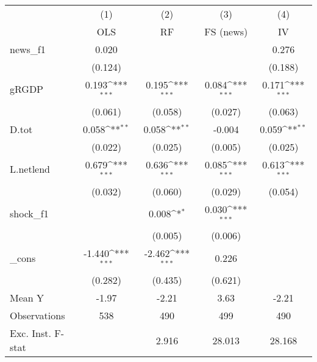 {
\def\sym#1{\ifmmode^{#1}\else\(^{#1}\)\fi}
\begin{tabular}{l*{4}{c}}
\toprule
            &\multicolumn{1}{c}{(1)}&\multicolumn{1}{c}{(2)}&\multicolumn{1}{c}{(3)}&\multicolumn{1}{c}{(4)}\\
            &\multicolumn{1}{c}{OLS}&\multicolumn{1}{c}{RF}&\multicolumn{1}{c}{FS (news)}&\multicolumn{1}{c}{IV}\\
\midrule
news\_f1     &       0.020         &                     &                     &       0.276         \\
            &     (0.124)         &                     &                     &     (0.188)         \\
\addlinespace
gRGDP       &       0.193\sym{***}&       0.195\sym{***}&       0.084\sym{***}&       0.171\sym{***}\\
            &     (0.061)         &     (0.058)         &     (0.027)         &     (0.063)         \\
\addlinespace
D.tot       &       0.058\sym{**} &       0.058\sym{**} &      -0.004         &       0.059\sym{**} \\
            &     (0.022)         &     (0.025)         &     (0.005)         &     (0.025)         \\
\addlinespace
L.netlend   &       0.679\sym{***}&       0.636\sym{***}&       0.085\sym{***}&       0.613\sym{***}\\
            &     (0.032)         &     (0.060)         &     (0.029)         &     (0.054)         \\
\addlinespace
shock\_f1    &                     &       0.008\sym{*}  &       0.030\sym{***}&                     \\
            &                     &     (0.005)         &     (0.006)         &                     \\
\addlinespace
\_cons      &      -1.440\sym{***}&      -2.462\sym{***}&       0.226         &                     \\
            &     (0.282)         &     (0.435)         &     (0.621)         &                     \\
\midrule
Mean Y      &       -1.97         &       -2.21         &        3.63         &       -2.21         \\
Observations&         538         &         490         &         499         &         490         \\
Exc. Inst. F-stat&                     &       2.916         &      28.013         &      28.168         \\
\bottomrule
\end{tabular}
}
